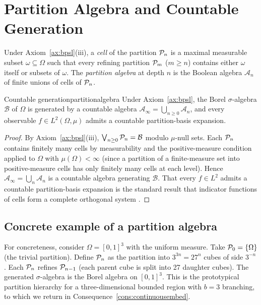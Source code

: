 \section{Partition Algebra and Countable Generation}
\label{sec:partitionalgebra}

\begin{definition}
\label{def:partition}
Under Axiom~\ref{ax:bpsl}(iii), a \emph{cell} of the partition $\mathcal{P}_{n}$ is a maximal measurable subset $\omega\subseteq\Omega$ such that every refining partition $\mathcal{P}_{m}$ ($m\ge n$) contains either $\omega$ itself or subsets of $\omega$. The \emph{partition algebra} at depth $n$ is the Boolean algebra $\mathcal{A}_{n}$ of finite unions of cells of $\mathcal{P}_{n}$.
\end{definition}

\begin{consequence}{Countable generation}{partitionalgebra}
Under Axiom~\ref{ax:bpsl}, the Borel $\sigma$-algebra $\mathcal{B}$ of $\Omega$ is generated by a countable algebra $\mathcal{A}_{\infty}=\bigcup_{n\ge 0}\mathcal{A}_{n}$, and every observable $f\in L^{2}(\Omega,\mu)$ admits a countable partition-basis expansion.
\end{consequence}

\begin{proof}
By Axiom~\ref{ax:bpsl}(iii), $\bigvee_{n\ge 0}\mathcal{P}_{n}=\mathcal{B}$ modulo $\mu$-null sets. Each $\mathcal{P}_{n}$ contains finitely many cells by measurability and the positive-measure condition applied to $\Omega$ with $\mu(\Omega)<\infty$ (since a partition of a finite-measure set into positive-measure cells has only finitely many cells at each level). Hence $\mathcal{A}_{\infty}=\bigcup_{n}\mathcal{A}_{n}$ is a countable algebra generating $\mathcal{B}$. That every $f\in L^{2}$ admits a countable partition-basis expansion is the standard result that indicator functions of cells form a complete orthogonal system \citep{halmos1950,rudin1987}.
\end{proof}

\subsection{Concrete example of a partition algebra}

For concreteness, consider $\Omega=[0,1]^{3}$ with the uniform measure. Take $\mathcal{P}_{0}=\{\Omega\}$ (the trivial partition). Define $\mathcal{P}_{n}$ as the partition into $3^{3n}=27^{n}$ cubes of side $3^{-n}$. Each $\mathcal{P}_{n}$ refines $\mathcal{P}_{n-1}$ (each parent cube is split into 27 daughter cubes). The generated $\sigma$-algebra is the Borel algebra on $[0,1]^{3}$. This is the prototypical partition hierarchy for a three-dimensional bounded region with $b=3$ branching, to which we return in Consequence~\ref{cons:continuousembed}.

